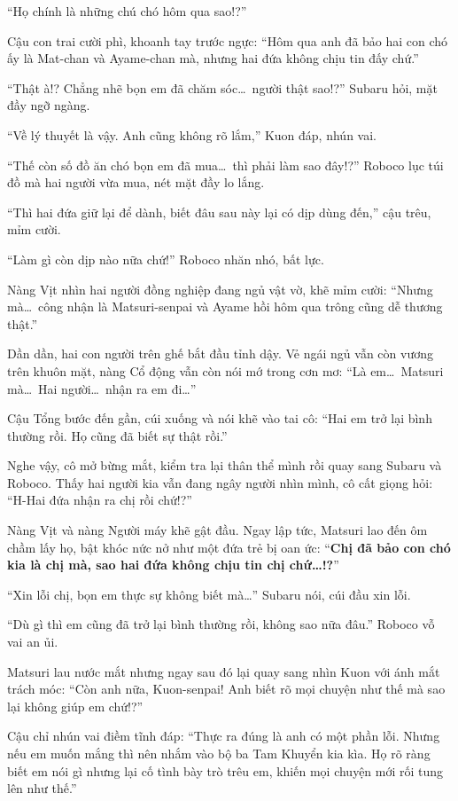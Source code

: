 \documentclass[../main.tex]{subfiles}
\begin{document}
``Họ chính là những chú chó hôm qua sao!?''

Cậu con trai cười phì, khoanh tay trước ngực: ``Hôm qua anh đã bảo hai con chó ấy là Mat-chan và Ayame-chan mà, nhưng hai đứa không chịu tin đấy chứ.''

``Thật à!? Chẳng nhẽ bọn em đã chăm sóc\dots\  người thật sao!?'' Subaru hỏi, mặt đầy ngỡ ngàng.

``Về lý thuyết là vậy. Anh cũng không rõ lắm,'' Kuon đáp, nhún vai.

``Thế còn số đồ ăn chó bọn em đã mua\dots\  thì phải làm sao đây!?'' Roboco lục túi đồ mà hai người vừa mua, nét mặt đầy lo lắng.

``Thì hai đứa giữ lại để dành, biết đâu sau này lại có dịp dùng đến,'' cậu trêu, mỉm cười.

``Làm gì còn dịp nào nữa chứ!'' Roboco nhăn nhó, bất lực.

Nàng Vịt nhìn hai người đồng nghiệp đang ngủ vật vờ, khẽ mỉm cười: ``Nhưng mà\dots\ công nhận là Matsuri-senpai và Ayame hồi hôm qua trông cũng dễ thương thật.''

Dần dần, hai con người trên ghế bắt đầu tỉnh dậy. Vẻ ngái ngủ vẫn còn vương trên khuôn mặt, nàng Cổ động vẫn còn nói mớ trong cơn mơ: ``Là em\dots\ Matsuri mà\dots\ Hai người\dots\ nhận ra em đi\dots''

Cậu Tổng bước đến gần, cúi xuống và nói khẽ vào tai cô: ``Hai em trở lại bình thường rồi. Họ cũng đã biết sự thật rồi.''

Nghe vậy, cô mở bừng mắt, kiểm tra lại thân thể mình rồi quay sang Subaru và Roboco. Thấy hai người kia vẫn đang ngây người nhìn mình, cô cất giọng hỏi: ``H-Hai đứa nhận ra chị rồi chứ!?''

Nàng Vịt và nàng Người máy khẽ gật đầu. Ngay lập tức, Matsuri lao đến ôm chầm lấy họ, bật khóc nức nở như một đứa trẻ bị oan ức: ``\textbf{Chị đã bảo con chó kia là chị mà, sao hai đứa không chịu tin chị chứ\dots!?}''

``Xin lỗi chị, bọn em thực sự không biết mà\dots'' Subaru nói, cúi đầu xin lỗi.

``Dù gì thì em cũng đã trở lại bình thường rồi, không sao nữa đâu.'' Roboco vỗ vai an ủi.

Matsuri lau nước mắt nhưng ngay sau đó lại quay sang nhìn Kuon với ánh mắt trách móc: ``Còn anh nữa, Kuon-senpai! Anh biết rõ mọi chuyện như thế mà sao lại không giúp em chứ!?''

Cậu chỉ nhún vai điềm tĩnh đáp: ``Thực ra đúng là anh có một phần lỗi. Nhưng nếu em muốn mắng thì nên nhắm vào bộ ba Tam Khuyển kia kìa. Họ rõ ràng biết em nói gì nhưng lại cố tình bày trò trêu em, khiến mọi chuyện mới rối tung lên như thế.''
\end{document}
